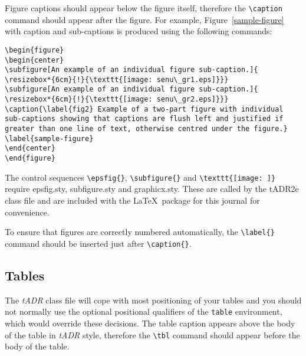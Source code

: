 \documentclass{tADR2e}
\begin{document}
Figure captions should appear below the figure itself, therefore the \verb"\caption" command should appear after the
figure. For example, Figure~\ref{sample-figure} with caption and sub-captions is produced using the following
commands:
%
\begin{verbatim}
\begin{figure}
\begin{center}
\subfigure[An example of an individual figure sub-caption.]{
\resizebox*{6cm}{!}{\texttt{[image: senu\_gr1.eps]}}}
\subfigure[An example of an individual figure sub-caption.]{
\resizebox*{6cm}{!}{\texttt{[image: senu\_gr2.eps]}}}
\caption{\label{fig2} Example of a two-part figure with individual 
sub-captions showing that captions are flush left and justified if 
greater than one line of text, otherwise centred under the figure.}
\label{sample-figure}
\end{center}
\end{figure}
\end{verbatim}


The control sequences \verb"\epsfig{}", \verb"\subfigure{}" and \verb"\texttt{[image: ]}" require epsfig.sty,
subfigure.sty and graphicx.sty. These are called by the tADR2e class file and are included with the \LaTeX\
package for this journal for convenience.

To ensure that figures are correctly numbered automatically, the \verb"\label{}" command should be inserted just
after \verb"\caption{}".


\subsection{Tables}

The {\it tADR} class file will cope with most positioning of your tables and you should not normally use the optional
positional qualifiers of the {\tt table} environment, which would override these decisions. The table caption
appears above the body of the table in {\it tADR} style, therefore the \verb"\tbl" command should appear before
the body of the table.
\end{document}
